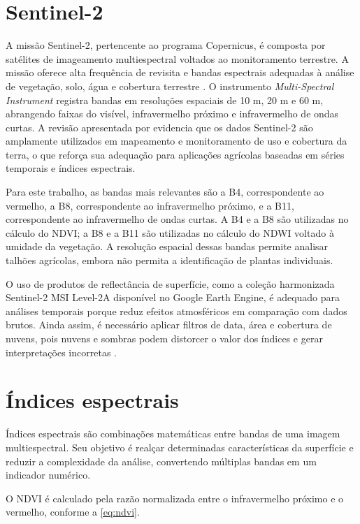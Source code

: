 \section{Sentinel-2}

A missão Sentinel-2, pertencente ao programa Copernicus, é composta por satélites de imageamento multiespectral voltados ao monitoramento terrestre. A missão oferece alta frequência de revisita e bandas espectrais adequadas à análise de vegetação, solo, água e cobertura terrestre \citep{ESA_SENTINEL2}. O instrumento \textit{Multi-Spectral Instrument} registra bandas em resoluções espaciais de 10 m, 20 m e 60 m, abrangendo faixas do visível, infravermelho próximo e infravermelho de ondas curtas. A revisão apresentada por \citet{PHIRI2020} evidencia que os dados Sentinel-2 são amplamente utilizados em mapeamento e monitoramento de uso e cobertura da terra, o que reforça sua adequação para aplicações agrícolas baseadas em séries temporais e índices espectrais.

Para este trabalho, as bandas mais relevantes são a B4, correspondente ao vermelho, a B8, correspondente ao infravermelho próximo, e a B11, correspondente ao infravermelho de ondas curtas. A B4 e a B8 são utilizadas no cálculo do NDVI; a B8 e a B11 são utilizadas no cálculo do NDWI voltado à umidade da vegetação. A resolução espacial dessas bandas permite analisar talhões agrícolas, embora não permita a identificação de plantas individuais.

O uso de produtos de reflectância de superfície, como a coleção harmonizada Sentinel-2 MSI Level-2A disponível no Google Earth Engine, é adequado para análises temporais porque reduz efeitos atmosféricos em comparação com dados brutos. Ainda assim, é necessário aplicar filtros de data, área e cobertura de nuvens, pois nuvens e sombras podem distorcer o valor dos índices e gerar interpretações incorretas \citep{GOOGLE_S2_SR}.

\section{Índices espectrais}

Índices espectrais são combinações matemáticas entre bandas de uma imagem multiespectral. Seu objetivo é realçar determinadas características da superfície e reduzir a complexidade da análise, convertendo múltiplas bandas em um indicador numérico.

O NDVI é calculado pela razão normalizada entre o infravermelho próximo e o vermelho, conforme a \cref{eq:ndvi}.

